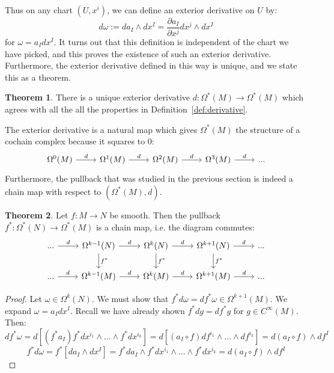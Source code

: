\documentclass[11pt, oneside]{article}   	%
\theoremstyle{definition}
\newtheorem{theorem}{Theorem}[section]
\begin{document}
Thus on any chart $(U, x^i)$, we can define an exterior derivative on $U$ by:
\begin{equation}
	d\omega := da_I\wedge dx^I = \frac{\partial a_I}{\partial x^j} dx^j\wedge dx^I
\end{equation}
for $\omega = a_I dx^I$. It turns out that this definition is independent of the chart we have picked, and this proves the 
existence of such an exterior derivative. Furthermore, the exterior derivative defined in this way is unique, and we state 
this as a theorem.
\begin{theorem}
	There is a unique exterior derivative $d : \Omega^*(M)\rightarrow\Omega^*(M)$ which agrees with all the all the 
	properties in Definition~\ref{def:derivative}. 
\end{theorem}

The exterior derivative is a natural map which gives $\Omega^*(M)$ the structure of a cochain complex because it squares to 
0:
\begin{equation}\begin{tikzcd}
	\Omega^0(M)\arrow[r, "d"] & \Omega^1(M) \arrow[r, "d"] & \Omega^2(M)\arrow[r, "d"] & \Omega^3(M)\arrow[r, "d"] & ...
\end{tikzcd}\end{equation}
Furthermore, the pullback that was studied in the previous section is indeed a chain map with respect to $(\Omega^*(M), d)$. 
\begin{theorem}
	Let $f : M\rightarrow N$ be smooth. Then the pullback $f^* : \Omega^*(N)\rightarrow\Omega^*(M)$ is a chain map, 
	i.e. the diagram commutes:
	\begin{equation}\begin{tikzcd}
		...\arrow[r, "d"] & \Omega^{k - 1}(N)\arrow[r, "d"]\arrow[d, "f^*"] & \Omega^k(N)\arrow[r, "d"]\arrow[d, "f^*"] &
		\Omega^{k + 1}(N)\arrow[r, "d"]\arrow[d, "f^*"] & ... \\
		...\arrow[r, "d"] & \Omega^{k - 1}(M)\arrow[r, "d"] & \Omega^k(M)\arrow[r, "d"] & \Omega^{k + 1}(M)\arrow[r, "d"] & 
		...
	\end{tikzcd}\end{equation}
\end{theorem}
\begin{proof}
	Let $\omega\in\Omega^k(N)$. We must show that $f^* d\omega = d f^*\omega\in\Omega^{k + 1}(M)$. We expand 
	$\omega = a_I dx^I$. Recall we have already shown $f^* dg = df^* g$ for $g\in C^\infty(M)$. Then:
	\begin{equation}
		df^*\omega = d\left[(f^* a_I) f^* dx^{i_1}\wedge ... \wedge f^* dx^{i_k}\right] = d\left[(a_I\circ f) df^{i_1}\wedge ... 
		\wedge df^{i_k}\right] = d(a_I\circ f)\wedge df^I
	\end{equation}
	\begin{equation}
		f^*d\omega = f^*\left[da_I\wedge dx^I\right] = f^* da_I\wedge f^* dx^{i_1}\wedge ...\wedge f^* dx^{i_k}
		= d(a_I\circ f)\wedge df^I
	\end{equation}
\end{proof}
\end{document}
